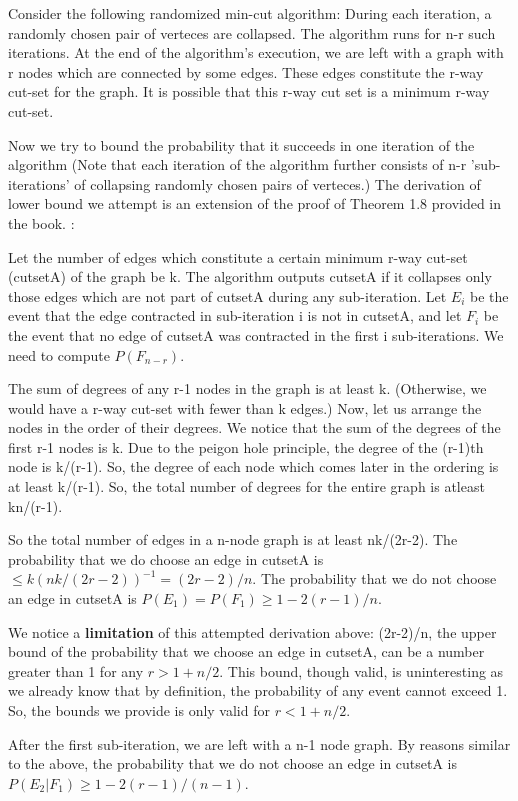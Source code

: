 \documentclass[10pt]{article}
\begin{document}
Consider the following randomized min-cut algorithm: During each iteration, a randomly chosen pair of verteces are collapsed. The algorithm runs for n-r such iterations. At the end of the algorithm's execution, we are left with a graph with r nodes which are connected by some edges. These edges constitute the r-way cut-set for the graph. It is possible that this r-way cut set is a minimum r-way cut-set.

Now we try to bound the probability that it succeeds in one iteration of the algorithm (Note that each iteration of the algorithm further consists of n-r 'sub-iterations' of collapsing randomly chosen pairs of verteces.) The derivation of lower bound we attempt is an extension of the proof of Theorem 1.8 provided in the book. \cite{mitzenmacherUpfal}:

Let the number of edges which constitute a certain minimum r-way cut-set (cutsetA) of the graph be k. The algorithm outputs cutsetA if it collapses only those edges which are not part of cutsetA during any sub-iteration. Let $E_{i}$ be the event that the edge contracted in sub-iteration i is not in cutsetA, and let $F_{i}$ be the event that no edge of cutsetA was contracted in the first i sub-iterations. We need to compute $P(F_{n-r})$.

The sum of degrees of any r-1 nodes in the graph is at least k. (Otherwise, we would have a r-way cut-set with fewer than k edges.) Now, let us arrange the nodes in the order of their degrees. We notice that the sum of the degrees of the first r-1 nodes is k. Due to the peigon hole principle, the degree of the (r-1)th node is k/(r-1). So, the degree of each node which comes later in the ordering is at least k/(r-1). So, the total number of degrees for the entire graph is atleast kn/(r-1). 

So the total number of edges in a n-node graph is at least nk/(2r-2). The probability that we do choose an edge in cutsetA is $\leq k(nk/(2r-2))^{-1}= (2r-2)/n$. The probability that we do not choose an edge in cutsetA is $P(E_{1})=P(F_{1})\geq 1-2(r-1)/n$.

We notice a \textbf{limitation} of this attempted derivation above: (2r-2)/n, the upper bound of the probability that we choose an edge in cutsetA, can be a number greater than 1 for any $r > 1+n/2$. This bound, though valid, is uninteresting as we already know that by definition, the probability of any event cannot exceed 1. So, the bounds we provide is only valid for $r < 1+n/2$.

After the first sub-iteration, we are left with a n-1 node graph. By reasons similar to the above, the probability that we do not choose an edge in cutsetA is $P(E_{2}|F_{1})\geq 1-2(r-1)/(n-1)$.
\end{document}
